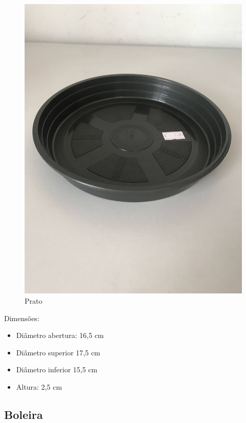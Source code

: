 \documentclass[
	12pt,				%
	openright,			%
	oneside,			%
	a4paper,			%
	chapter=TITLE,		%
	english,			%
	brazil				%
	]{abntex2}
\begin{document}
\begin{figure}[H]
    \centering
    \includegraphics[scale=0.04, angle=-90]{imagens/IMG_0599.jpg}
    \caption{Prato}
    \label{fig:prato}
\end{figure}        
Dimensões: 

\begin{itemize}
    \item Diâmetro abertura: 16,5 cm
    \item Diâmetro superior 17,5 cm
    \item Diâmetro inferior 15,5 cm
    \item Altura: 2,5 cm
\end{itemize}

\subsection{Boleira}
\end{document}
